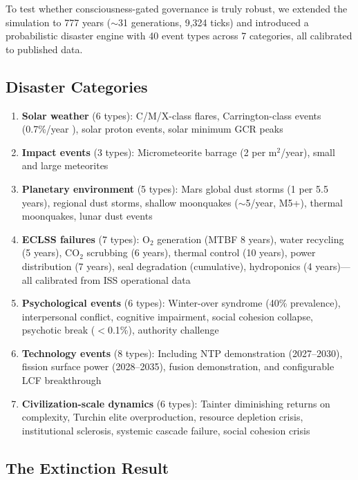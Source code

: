 \documentclass[12pt,a4paper]{article}
\begin{document}
To test whether consciousness-gated governance is truly robust, we extended the simulation to 777 years ($\sim$31 generations, 9,324 ticks) and introduced a probabilistic disaster engine with 40 event types across 7 categories, all calibrated to published data.

\subsection{Disaster Categories}

\begin{enumerate}
    \item \textbf{Solar weather} (6 types): C/M/X-class flares, Carrington-class events (0.7\%/year \citep{riley2012probability}), solar proton events, solar minimum GCR peaks
    \item \textbf{Impact events} (3 types): Micrometeorite barrage (2 per m$^2$/year), small and large meteorites
    \item \textbf{Planetary environment} (5 types): Mars global dust storms (1 per 5.5 years), regional dust storms, shallow moonquakes ($\sim$5/year, M5+), thermal moonquakes, lunar dust events
    \item \textbf{ECLSS failures} (7 types): O$_2$ generation (MTBF 8 years), water recycling (5 years), CO$_2$ scrubbing (6 years), thermal control (10 years), power distribution (7 years), seal degradation (cumulative), hydroponics (4 years)---all calibrated from ISS operational data
    \item \textbf{Psychological events} (6 types): Winter-over syndrome (40\% prevalence), interpersonal conflict, cognitive impairment, social cohesion collapse, psychotic break ($<$0.1\%), authority challenge
    \item \textbf{Technology events} (8 types): Including NTP demonstration (2027--2030), fission surface power (2028--2035), fusion demonstration, and configurable LCF breakthrough
    \item \textbf{Civilization-scale dynamics} (6 types): Tainter diminishing returns on complexity, Turchin elite overproduction, resource depletion crisis, institutional sclerosis, systemic cascade failure, social cohesion crisis
\end{enumerate}

\subsection{The Extinction Result}
\end{document}
